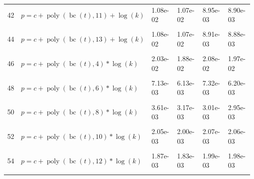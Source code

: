 \documentclass[12pt,a4paper]{article}
\DeclareMathOperator{\bc}{bc}
\DeclareMathOperator{\poly}{poly}
\begin{document}
\begin{longtable}[t]{ll>{\raggedleft\arraybackslash}p{2cm}>{\raggedleft\arraybackslash}p{2cm}>{\raggedleft\arraybackslash}p{2cm}>{\raggedleft\arraybackslash}p{2cm}}
42 & $p = c + \poly\left( \bc(t), 11 \right) + \log(k)$ & 1.08e-02 & 1.07e-02 & 8.95e-03 & 8.90e-03\\
\cellcolor{gray!6}{43} & \cellcolor{gray!6}{$p = c + \poly\left( \bc(t), 12 \right) + \log(k)$} & \cellcolor{gray!6}{1.08e-02} & \cellcolor{gray!6}{1.07e-02} & \cellcolor{gray!6}{8.93e-03} & \cellcolor{gray!6}{8.89e-03}\\
44 & $p = c + \poly\left( \bc(t), 13 \right) + \log(k)$ & 1.08e-02 & 1.07e-02 & 8.91e-03 & 8.88e-03\\
\cellcolor{gray!6}{45} & \cellcolor{gray!6}{$p = c + \poly\left( \bc(t), 3 \right) * \log(k)$} & \cellcolor{gray!6}{2.73e-02} & \cellcolor{gray!6}{1.80e-02} & \cellcolor{gray!6}{1.88e-02} & \cellcolor{gray!6}{1.76e-02}\\
46 & $p = c + \poly\left( \bc(t), 4 \right) * \log(k)$ & 2.03e-02 & 1.88e-02 & 2.08e-02 & 1.97e-02\\
\cellcolor{gray!6}{47} & \cellcolor{gray!6}{$p = c + \poly\left( \bc(t), 5 \right) * \log(k)$} & \cellcolor{gray!6}{1.52e-02} & \cellcolor{gray!6}{1.49e-02} & \cellcolor{gray!6}{1.24e-02} & \cellcolor{gray!6}{1.21e-02}\\
48 & $p = c + \poly\left( \bc(t), 6 \right) * \log(k)$ & 7.13e-03 & 6.13e-03 & 7.32e-03 & 6.20e-03\\
\cellcolor{gray!6}{49} & \cellcolor{gray!6}{$p = c + \poly\left( \bc(t), 7 \right) * \log(k)$} & \cellcolor{gray!6}{6.15e-03} & \cellcolor{gray!6}{4.96e-03} & \cellcolor{gray!6}{5.17e-03} & \cellcolor{gray!6}{4.74e-03}\\
50 & $p = c + \poly\left( \bc(t), 8 \right) * \log(k)$ & 3.61e-03 & 3.17e-03 & 3.01e-03 & 2.95e-03\\
\cellcolor{gray!6}{51} & \cellcolor{gray!6}{$p = c + \poly\left( \bc(t), 9 \right) * \log(k)$} & \cellcolor{gray!6}{3.17e-03} & \cellcolor{gray!6}{2.91e-03} & \cellcolor{gray!6}{3.19e-03} & \cellcolor{gray!6}{3.01e-03}\\
52 & $p = c + \poly\left( \bc(t), 10 \right) * \log(k)$ & 2.05e-03 & 2.00e-03 & 2.07e-03 & 2.06e-03\\
\cellcolor{gray!6}{53} & \cellcolor{gray!6}{$p = c + \poly\left( \bc(t), 11 \right) * \log(k)$} & \cellcolor{gray!6}{1.93e-03} & \cellcolor{gray!6}{1.88e-03} & \cellcolor{gray!6}{2.08e-03} & \cellcolor{gray!6}{2.04e-03}\\
54 & $p = c + \poly\left( \bc(t), 12 \right) * \log(k)$ & 1.87e-03 & 1.83e-03 & 1.99e-03 & 1.98e-03\\
\cellcolor{gray!6}{55} & \cellcolor{gray!6}{$p = c + \poly\left( \bc(t), 13 \right) * \log(k)$} & \cellcolor{gray!6}{1.76e-03} & \cellcolor{gray!6}{1.75e-03} & \cellcolor{gray!6}{1.93e-03} & \cellcolor{gray!6}{1.93e-03}\\

\end{longtable}
\end{document}
